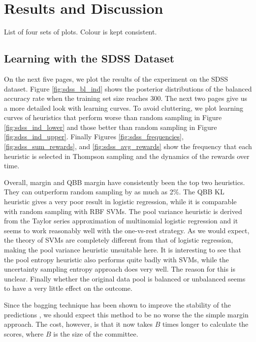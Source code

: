 \section{Results and Discussion}
\label{sec:results2}

List of four sets of plots. Colour is kept consistent.

\subsection{Learning with the SDSS Dataset}
\label{sub:learnsdss}

On the next five pages, we plot the results of the experiment on the SDSS dataset.
Figure \ref{fig:sdss_bl_ind} shows the posterior distributions of the
balanced accuracy rate when the training set size reaches 300. The next two pages give us
a more detailed look with learning curves. To avoid cluttering, we plot learning curves
of heuristics that perform worse than random sampling in Figure \ref{fig:sdss_ind_lower}
and those better than random sampling in Figure \ref{fig:sdss_ind_upper}. Finally
Figures \ref{fig:sdss_frequencies}, \ref{fig:sdss_sum_rewards}, and
\ref{fig:sdss_avg_rewards} show the frequency that each heuristic is selected in Thompson
sampling and the dynamics of the rewards over time.

Overall, margin and QBB margin have consistently been the top two heuristics. They can
outperform random sampling by as much as 2\%. The QBB KL heuristic gives a very poor result
in logistic regression, while it is comparable with random sampling with RBF SVMs.
The pool variance heuristic is derived from the Taylor series approximation
of multinomial logistic regression and it seems to work reasonably well with the one-vs-rest
strategy. As we would expect, the theory of SVMs are completely different from that of logistic
regression, making the pool variance heuristic unsuitable here. It is interesting
to see that the pool entropy heuristic also performs quite badly with SVMs, while
the uncertainty sampling entropy approach does very well. The reason for this is unclear.
Finally whether the original data pool is balanced or unbalanced seems to have a very little effect
on the outcome.

Since the bagging technique has been shown to improve the stability of the predictions
\cite{breiman96}, we should expect this method to be no worse the the simple margin approach. The
cost, however, is that it now takes $B$ times longer to calculate the scores, where $B$ is the size
of the committee.

